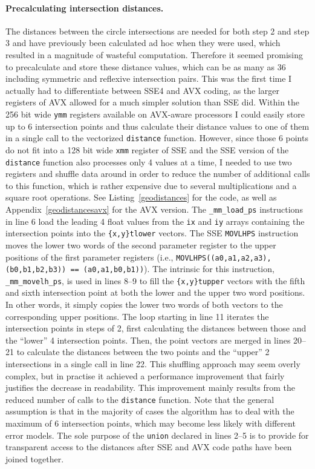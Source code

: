 \paragraph{Precalculating intersection distances.} The distances between the circle intersections are needed for both step 2 and step 3 and have previously been calculated ad hoc when they were used, which resulted in a magnitude of wasteful computation. Therefore it seemed promising to precalculate and store these distance values, which can be as many as 36 including symmetric and reflexive intersection pairs. This was the first time I actually had to differentiate between SSE4 and AVX coding, as the larger registers of AVX allowed for a much simpler solution than SSE did. Within the 256 bit wide \texttt{ymm} registers available on AVX-aware processors I could easily store up to 6 intersection points and thus calculate their distance values to one of them in a single call to the vectorized \texttt{distance} function. However, since those 6 points do not fit into a 128 bit wide \texttt{xmm} register of SSE and the SSE version of the \texttt{distance} function also processes only 4 values at a time, I needed to use two registers and shuffle data around in order to reduce the number of additional calls to this function, which is rather expensive due to several multiplications and a square root operations. See Listing~\ref{geodistances} for the code, as well as Appendix~\ref{geodistancesavx} for the AVX version. The \texttt{\_mm\_load\_ps} instructions in line 6 load the leading 4 float values from the \texttt{ix} and \texttt{iy} arrays containing the intersection points into the \texttt{\{x,y\}tlower} vectors. The SSE \texttt{MOVLHPS} instruction moves the lower two words of the second parameter register to the upper positions of the first parameter registers (i.e., \texttt{MOVLHPS((a0,a1,a2,a3), (b0,b1,b2,b3)) == (a0,a1,b0,b1))}). The intrinsic for this instruction, \texttt{\_mm\_movelh\_ps}, is used in lines 8--9 to fill the \texttt{\{x,y\}tupper} vectors with the fifth and sixth intersection point at both the lower and the upper two word positions. In other words, it simply copies the lower two words of both vectors to the corresponding upper positions. The loop starting in line 11 iterates the intersection points in steps of 2, first calculating the distances between those and the ``lower'' 4 intersection points. Then, the point vectors are merged in lines 20--21 to calculate the distances between the two points and the ``upper'' 2 intersections in a single call in line 22. This shuffling approach may seem overly complex, but in practise it achieved a performance improvement that fairly justifies the decrease in readability. This improvement mainly results from the reduced number of calls to the \texttt{distance} function. Note that the general assumption is that in the majority of cases the algorithm has to deal with the maximum of 6 intersection points, which may become less likely with different error models. The sole purpose of the \texttt{union} declared in lines 2--5 is to provide for transparent access to the distances after SSE and AVX code paths have been joined together.

